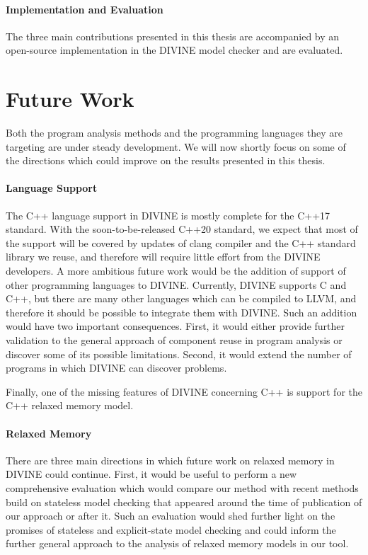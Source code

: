 \paragraph{Implementation and Evaluation}

The three main contributions presented in this thesis are accompanied by an open-source implementation in the DIVINE model checker and are evaluated.

\section{Future Work}

Both the program analysis methods and the programming languages they are targeting are under steady development.
We will now shortly focus on some of the directions which could improve on the results presented in this thesis.

\paragraph{Language Support}

The C++ language support in DIVINE is mostly complete for the C++17 standard.
With the soon-to-be-released C++20 standard, we expect that most of the support will be covered by updates of clang compiler and the C++ standard library we reuse, and therefore will require little effort from the DIVINE developers.
A more ambitious future work would be the addition of support of other programming languages to DIVINE.
Currently, DIVINE supports C and C++, but there are many other languages which can be compiled to LLVM, and therefore it should be possible to integrate them with DIVINE.
Such an addition would have two important consequences.
First, it would either provide further validation to the general approach of component reuse in program analysis or discover some of its possible limitations.
Second, it would extend the number of programs in which DIVINE can discover problems.

Finally, one of the missing features of DIVINE concerning C++ is support for the C++ relaxed memory model.

\paragraph{Relaxed Memory}

There are three main directions in which future work on relaxed memory in DIVINE could continue.
First, it would be useful to perform a new comprehensive evaluation which would compare our method with recent methods build on stateless model checking that appeared around the time of publication of our approach or after it.
Such an evaluation would shed further light on the promises of stateless and explicit-state model checking and could inform the further general approach to the analysis of relaxed memory models in our tool.

